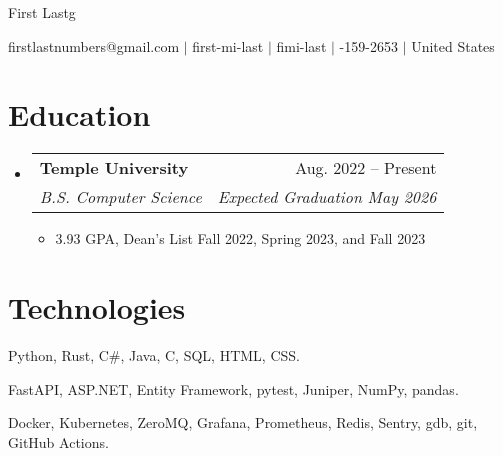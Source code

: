 \documentclass[letterpaper,11pt]{article}
\makeatletter
\newcommand{\resumeSubheading}[4]{%
  \item
    \begin{tabular*}{0.97\textwidth}[t]{l@{\extracolsep{\fill}}r}
      \textbf{#1} & #2 \\
      \textit{\small#3} & \textit{\small #4} \\
    \end{tabular*}\vspace{-7pt}
}
\newcommand{\resumeSubheadingListStart}{\begin{itemize}[leftmargin=0.15in, label={}]}
\newcommand{\resumeSubheadingListEnd}{\end{itemize}}
\newenvironment{resumeItemize}
{
    \begin{itemize}
} %
{
    \end{itemize}
} %
\newcommand{\myemail}{firstlastnumbers@gmail.com}
\newcommand{\myname}{First Lastg}
\newcommand{\mygh}{first-mi-last}
\newcommand{\mylinkedin}{fimi-last}
\newcommand{\myphone}{314-159-2653}
\newcommand{\mylocation}{United States}
\newcommand{\myemail}{jonathanzhang929@gmail.com}
\newcommand{\myname}{Jonathan Zhang}
\newcommand{\mygh}{jonathan-d-zhang}
\newcommand{\mylinkedin}{jd-zhang}
\newcommand{\myphone}{484-986-8012}
\newcommand{\mylocation}{Philadelphia, PA}
\makeatother
\begin{document}
{\Huge \myname}
\\
\vspace{2pt}

\small{
    \faEnvelope
    \thinspace \thinspace
    \myemail
    \thinspace \thinspace $|$
    \faGithub
    \thinspace \thinspace
    \mygh
    \thinspace \thinspace $|$
    \faLinkedin
    \thinspace \thinspace
    \mylinkedin
    \thinspace \thinspace $|$
    \faPhone
    \thinspace \thinspace
    \myphone
    \thinspace \thinspace $|$
    \thinspace \thinspace
    \mylocation
}

\vspace{-8pt}

\section{Education}
  \resumeSubheadingListStart
    \resumeSubheading{Temple University}{Aug. 2022 -- Present}{B.S. Computer Science}{Expected Graduation May 2026}
    \begin{resumeItemize}
        \item 3.93 GPA, Dean's List Fall 2022, Spring 2023, and Fall 2023
    \end{resumeItemize}
  \resumeSubheadingListEnd

\section{Technologies}
\begin{description}[nosep, left=0.15in]
    \item[Programming Languages:]
        Python,
        Rust,
        C\#,
        Java,
        C,
        SQL,
        HTML,
        CSS.
    \item[Libraries:]
        FastAPI,
        ASP.NET,
        Entity Framework,
        pytest,
        Juniper,
        NumPy,
        pandas.
    \item[Tools:]
        Docker,
        Kubernetes,
        ZeroMQ,
        Grafana,
        Prometheus,
        Redis,
        Sentry,
        gdb,
        git,
        GitHub Actions.
\end{description}
\end{document}
